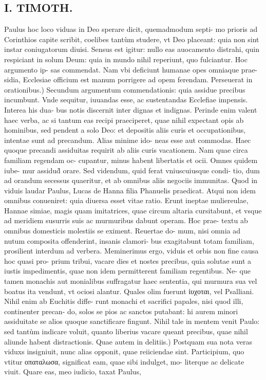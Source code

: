 \documentclass{article}
\begin{document}
\begin{pages}
\section*{I. TIMOTH. }
\marginpar{[ p.58 ]}\pstart Paulus hoc loco viduas in Deo sperare dicit, quemadmodum septi- mo prioris ad Corinthios capite scribit, coelibes tantùm studere, vt Deo placeant: quia non sint instar coniugatorum diuisi. Sensus est igitur: nullo eas auocamento distrahi, quin respiciant in solum Deum: quia in mundo nihil reperiunt, quo fulciantur. Hoc argumento ip- sas commendat. Nam vbi deficiunt humanae opes omniaque prae- sidia, Ecclesiae officium est manum porrigere ad opem ferendam.  \pend\pstart Perseuerat in orationibus.) Secundum argumentum commendationis: quia assidue precibus incumbunt. Vnde sequitur, iuuandas esse, ac sustentandas Ecclefiae impensis. Interea his dua- bus notis discernit inter dignas et indignas. Perinde enim valent haec verba, ac si tantum eas recipi praeciperet, quae nihil expectant opis ab hominibus, sed pendent a solo Deo: et depositis aliis curis et occupationibus, intentae sunt ad precandum. Alias minime ido- neas esse aut commodas. Haec quoque precandi assiduitas requirit ab aliis curis vacationem. Nam quae circa familiam regendam oc- cupantur, minus habent libertatis et ocii. Omnes quidem iube- mur assidud̀ orare. Sed videndum, quid ferat vniuscuiusque condi- tio, dum ad orandum secessus quaeritur, et ab omnibus aliis negociis immunitas. Quod in viduis laudar Paulus, Lucas de Hanna filia Phanuelis praedicat. Atqui non idem omnibus conueniret: quia diuersa esset vitae ratio. Erunt ineptae muliereulae, Hannae simiae, magis quam imitatrices, quae circum altaria cursitabunt, et vsque ad meridiem susurris suis ac murmuribus dabunt operam. Hoc prae- textu ab omnibus domesticis molestiis se eximent. Reuertae do- mum, nisi omnia ad nutum composita offenderint, insanis clamori- bus exagitabunt totam familiam, prosilient interdum ad verbera. Meminerimus ergo, viduis et orbis non fine causa hoc quasi pro- prium tribui, vacare dies et nostes precibus, quia solutae sunt a iustis impedimentis, quae non idem permitterent familiam regentibus. Ne- que tamen monachis aut monialibus suffragatur haec sententia, qui murmura sua vel boatus ita vendunt, vt ociosi alantur. Quales olim fuerunt ἰυχοται, vel Psalliani. Nihil enim ab Euchitis diffe- runt monachi et sacrifici papales, nisi quod illi, continenter precan- do, solos se pios ac sanctos putabant: hi aurem minori assiduitate se alios quoque sanctificare fingunt. Nihil tale in mentem venit Paulo: sed tantùm indicare voluit, quanto liberius vacare queant precibus, quae nihil aliunde habent distractionis.  \pend\pstart Quae autem in delitiis.) Postquam sua nota veras viduxs insigniuit, nunc alias opponit, quae reiiciendae sint. Participium, quo vtitur οπαταλωσα, significat eam, quae sibi indulget, mo- literque ac delicate viuit. Quare eas, meo iudicio, taxat Paulus,  \pend

\end{pages}
\end{document}
